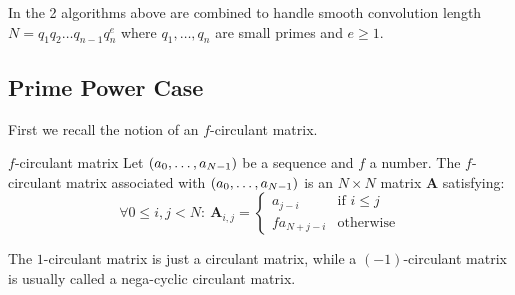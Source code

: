 In  the 2 algorithms above are combined to handle smooth convolution length \(N = q_1 q_2 \ldots q_{n-1} q_n^e\) where \(q_1, \ldots, q_n\) are small primes and \(e \ge 1\).

\subsection{Prime Power Case}
First we recall the notion of an \(f\)-circulant matrix.
\begin{definition}{\(f\)-circulant matrix} \label{def:CircMat}
    Let \(\left({a}_0, \ldots, {a}_{N - 1}\right)\) be a sequence and \(f\) a number. The \(f\)-circulant matrix associated with \(\left({a}_0, \ldots, {a}_{N - 1}\right)\) is an \(N \times N\) matrix \(\bm{A}\) satisfying:
    \[\forall 0 \le i,j < N:\: \bm{A}_{i,j} = \begin{cases}
        a_{j - i} & \text{if \(i \le j\)} \\
        f a_{N+j-i} & \text{otherwise}
    \end{cases}\]
\end{definition}
The \(1\)-circulant matrix is just a circulant matrix, while a \((-1)\)-circulant matrix is usually called a nega-cyclic circulant matrix.

